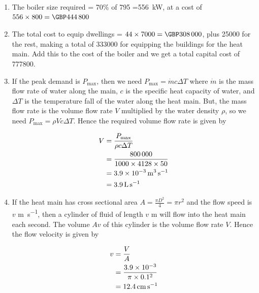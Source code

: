 \documentclass[parskip=half]{scrartcl}
\begin{document}
\begin{enumerate}
To this we need to add the peak heat demand for hot water. We can only estimate this, but if we assume that all properties heat water for 6 hours per day every day, or 2190 hours per year, then the peak hot water power demand is 179/2190 = \SI{0.082}{\mega\watt} = \SI{82}{\kilo\watt}.
Hence we find that the peak heat power demand is \SI{795}{\kilo\watt}.

\item The boiler size required = 70\% of 795 =\SI{556}{\kilo\watt}, at a cost of $556\times800 = \SI{444800}[\GBP]{}$

\item The total cost to equip dwellings = $44\times 7000=\SI{308000}[\GBP]{}$, plus \SI{25000}[\GBP]{} for the rest, making a total of \SI{333000}[\GBP]{} for equipping the buildings for the heat main. Add this to the cost of the boiler and we get a total capital cost of \SI{777800}[\GBP]{}.

\item If the peak demand is $P_\text{max}$, then we need $P_\mathrm{max}=\dot m c \Delta T$ where $\dot m$ is the mass flow rate of water along the main, $c$ is the  specific heat capacity of water, and $\Delta T$ is the temperature fall of the water along the heat main. But, the mass flow rate is the volume flow rate $V$ multiplied by the water density $\rho$, so we need $P_\mathrm{max}=\rho V c \Delta T$.  Hence the required volume flow rate is given by

\begin{align}
V &=\frac{P_\mathrm{max}}{\rho c \Delta T}\\&=\frac{\num{800000}}{1000\times 4128\times 50}\notag\\&=\SI{3.9e-3}{\metre\cubed\per\second}\notag\\&=\SI{3.9}{\litre\per\second}\notag
\label{eq:vfr}
\end{align}

\item If the heat main has cross sectional area $A=\frac{\pi D^2}{4}=\pi r^2$ and the flow speed is $v$ \si{\metre\per\second}, then a cylinder of fluid of length $v$ m will flow into the heat main each second. The volume $Av$ of this cylinder is the volume flow rate $V$. Hence the flow  velocity is given by

\begin{align}
v &=\dfrac{V}{A}\\&=\dfrac{\num{3.9e-3}}{\pi\times 0.1^2}\notag\\&=\SI{12.4}{\cm\per\second}\notag
\label{eq:flowv}
\end{align}


\end{enumerate}
\end{document}

